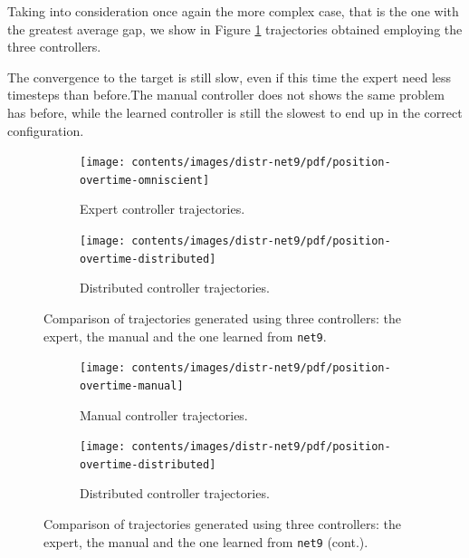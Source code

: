 Taking into consideration once again the more complex case, that is the one 
with the greatest average gap, we show in Figure \ref{fig:net9traj} trajectories 
obtained employing the three controllers. 

The convergence to the target is still slow, even if this time the expert need 
less timesteps than before.The manual controller does not shows the same 
problem has before, while the learned controller is still the slowest to end up in 
the correct configuration.
\begin{figure}[!htb]
	\begin{center}
		\begin{subfigure}[h]{0.49\textwidth}
			\centering
			\texttt{[image: contents/images/distr-net9/pdf/position-overtime-omniscient]}%
			\caption{Expert controller trajectories.}
		\end{subfigure}
		\hfill
		\begin{subfigure}[h]{0.49\textwidth}
			\centering
			\texttt{[image: contents/images/distr-net9/pdf/position-overtime-distributed]}
			\caption{Distributed controller trajectories.}
		\end{subfigure}
	\end{center}
	\caption[Evaluation of the trajectories learned by 
	\texttt{net9}.]{Comparison of trajectories generated using three controllers: the 
	expert, the manual and the one learned from \texttt{net9}.}
\end{figure}
\medskip
\begin{figure}[!htb]\ContinuedFloat
	\centering
	\begin{subfigure}[h]{0.49\textwidth}
		\centering
		\texttt{[image: contents/images/distr-net9/pdf/position-overtime-manual]}%
		\caption{Manual controller trajectories.}
	\end{subfigure}
	\hfill
	\begin{subfigure}[h]{0.49\textwidth}
		\centering
		\texttt{[image: contents/images/distr-net9/pdf/position-overtime-distributed]}
		\caption{Distributed controller trajectories.}
	\end{subfigure}
	\caption[]{Comparison of trajectories generated using three controllers: the 
	expert, the manual and the one learned from \texttt{net9} (cont.).}
	\label{fig:net9traj}
\end{figure}

